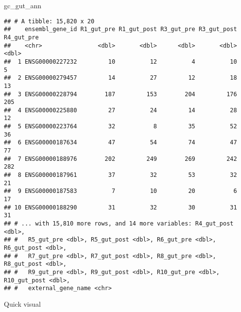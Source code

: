\documentclass[
]{article}
\newenvironment{Shaded}{\begin{snugshade}}{\end{snugshade}}
\newcommand{\NormalTok}[1]{#1}
\begin{document}
\begin{Shaded}
\begin{Highlighting}[]
\NormalTok{gc\_gut\_ann}
\end{Highlighting}
\end{Shaded}

\begin{verbatim}
## # A tibble: 15,820 x 20
##    ensembl_gene_id R1_gut_pre R1_gut_post R3_gut_pre R3_gut_post R4_gut_pre
##    <chr>                <dbl>       <dbl>      <dbl>       <dbl>      <dbl>
##  1 ENSG00000227232         10          12          4          10          5
##  2 ENSG00000279457         14          27         12          18         13
##  3 ENSG00000228794        187         153        204         176        205
##  4 ENSG00000225880         27          24         14          28         12
##  5 ENSG00000223764         32           8         35          52         36
##  6 ENSG00000187634         47          54         74          47         77
##  7 ENSG00000188976        202         249        269         242        282
##  8 ENSG00000187961         37          32         53          32         21
##  9 ENSG00000187583          7          10         20           6         17
## 10 ENSG00000188290         31          32         30          31         31
## # ... with 15,810 more rows, and 14 more variables: R4_gut_post <dbl>,
## #   R5_gut_pre <dbl>, R5_gut_post <dbl>, R6_gut_pre <dbl>, R6_gut_post <dbl>,
## #   R7_gut_pre <dbl>, R7_gut_post <dbl>, R8_gut_pre <dbl>, R8_gut_post <dbl>,
## #   R9_gut_pre <dbl>, R9_gut_post <dbl>, R10_gut_pre <dbl>, R10_gut_post <dbl>,
## #   external_gene_name <chr>
\end{verbatim}

Quick visual
\end{document}
